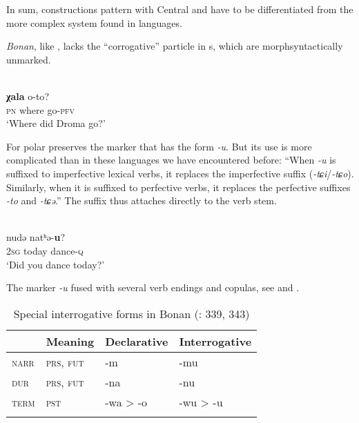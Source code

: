 In sum,   constructions pattern with Central  and have to be differentiated from the more complex system found in  languages.

\textit{Bonan}, like , lacks the “corrogative” particle in s, which are morphsyntactically unmarked.

\ea%
    \label{ex:mong:38}
    \\
     \textbf{{χala}} {o-to}?\\
    \textsc{pn}  where  go-\textsc{pfv}\\
    \glt ‘Where did Droma go?’ \citep[261]{Fried2010}
    \z

For polar   preserves the   marker that has the form \textit{-u}. But its use is more complicated than in these  languages we have encountered before: “When \textit{-u} is suffixed to imperfective lexical verbs, it replaces the imperfective suffix (\textit{-tɕi}/\textit{-tɕo}). Similarly, when it is suffixed to perfective verbs, it replaces the perfective suffixes \textit{-to} and \textit{-tɕə}.” \citep[258]{Fried2010} The suffix thus attaches directly to the verb stem.

\ea%
    \label{ex:mong:39}
    \\
     {nudə} {natʰə-}\textbf{{u}}?\\
    2\textsc{sg}   today  dance-\textsc{q}\\
    \glt ‘Did you dance today?’ \citep[259]{Fried2010}
    \z

The  marker \textit{-u} fused with several verb endings and copulas, see  and .

\begin{table}
\caption{Special interrogative forms in Bonan (\citealt{WuHugjiltu2003}: 339, 343)}
\label{tab:mong:3}

\begin{tabularx}{\textwidth}{XXXl}
\lsptoprule
& \textbf{Meaning} & \textbf{Declarative} & \textbf{Interrogative}\\
\midrule
\textsc{narr} & \textsc{prs, fut} & -m & -mu\\
\textsc{dur} & \textsc{prs, fut} & -na & -nu\\
\textsc{term} & \textsc{pst} & -wa > -o & -wu > -u\\
\lspbottomrule
\end{tabularx}
\end{table}


